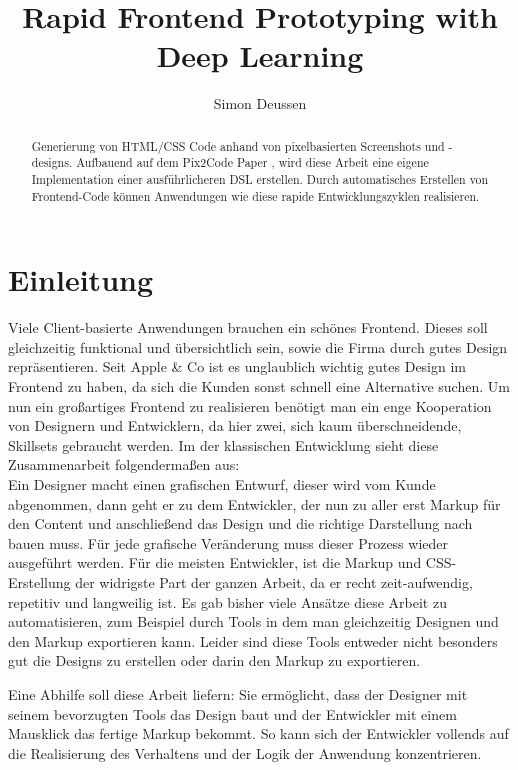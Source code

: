 \documentclass[pdftex,a4paper,halfparskip]{scrartcl}
\title{Rapid Frontend Prototyping with Deep Learning} %
\author{Simon Deussen}	%
\begin{document}
\maketitle	

\begin{abstract}
Generierung von HTML/CSS Code anhand von pixelbasierten Screenshots und -designs. Aufbauend auf dem Pix2Code Paper \cite{Beltramelli17}, wird diese Arbeit eine eigene Implementation einer ausführlicheren DSL erstellen. Durch automatisches Erstellen von Frontend-Code können Anwendungen wie diese rapide Entwicklungszyklen realisieren. 
\end{abstract}


\tableofcontents	%
\section{Einleitung} 

Viele Client-basierte Anwendungen brauchen ein schönes Frontend. Dieses soll gleichzeitig funktional und übersichtlich sein, sowie die Firma durch gutes Design repräsentieren. Seit Apple \& Co ist es unglaublich wichtig gutes Design im Frontend zu haben, da sich die Kunden sonst schnell eine Alternative suchen. Um nun ein großartiges Frontend zu realisieren benötigt man ein enge Kooperation von Designern und Entwicklern, da hier zwei, sich kaum überschneidende, Skillsets gebraucht werden. Im der klassischen Entwicklung sieht diese Zusammenarbeit folgendermaßen aus: \\
Ein Designer macht einen grafischen Entwurf, dieser wird vom Kunde abgenommen, dann geht er zu dem Entwickler, der nun zu aller erst Markup für den Content und anschließend das Design und die richtige Darstellung nach bauen muss. Für jede grafische Veränderung muss dieser Prozess wieder ausgeführt werden. Für die meisten Entwickler, ist die Markup und CSS-Erstellung der widrigste Part der ganzen Arbeit, da er recht zeit-aufwendig, repetitiv und langweilig ist. Es gab bisher viele Ansätze diese Arbeit zu automatisieren, zum Beispiel durch Tools in dem man gleichzeitig Designen und den Markup exportieren kann. Leider sind diese Tools entweder nicht besonders gut die Designs zu erstellen oder darin den Markup zu exportieren.

Eine Abhilfe soll diese Arbeit liefern: Sie ermöglicht, dass der Designer mit seinem bevorzugten Tools das Design baut und der Entwickler mit einem Mausklick das fertige Markup bekommt. So kann sich der Entwickler vollends auf die Realisierung des Verhaltens und der Logik der Anwendung konzentrieren. 
\end{document}
